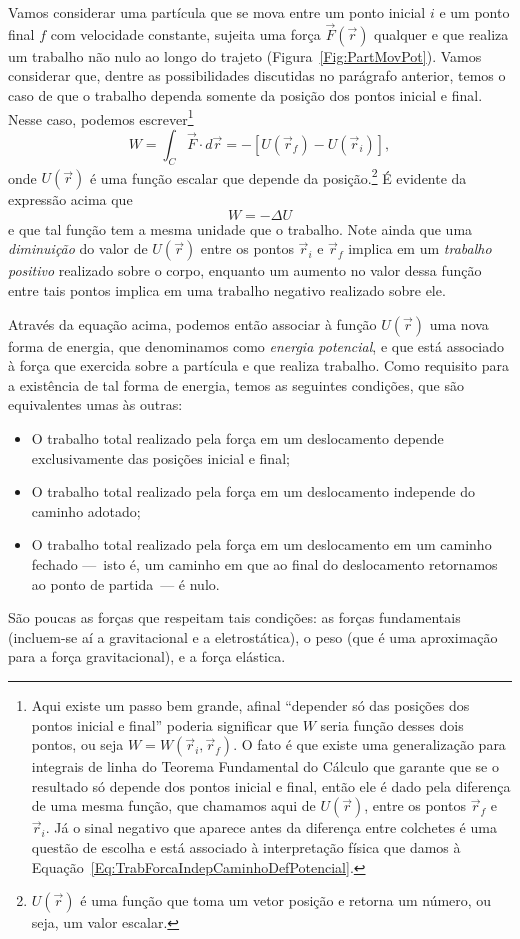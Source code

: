 Vamos considerar uma partícula que se mova entre um ponto inicial $i$ e um ponto final $f$ com velocidade constante, sujeita uma força $\vec{F}(\vec{r})$ qualquer e que realiza um trabalho não nulo ao longo do trajeto (Figura~\ref{Fig:PartMovPot}). Vamos considerar que, dentre as possibilidades discutidas no parágrafo anterior, temos o caso de que o trabalho dependa somente da posição dos pontos inicial e final. Nesse caso, podemos escrever\footnote{Aqui existe um passo bem grande, afinal ``depender só das posições dos pontos inicial e final'' poderia significar que $W$ seria função desses dois pontos, ou seja $W = W(\vec{r}_i, \vec{r}_f)$. O fato é que existe uma generalização para integrais de linha do Teorema Fundamental do Cálculo que garante que se o resultado só depende dos pontos inicial e final, então ele é dado pela diferença de uma mesma função, que chamamos aqui de $U(\vec{r})$, entre os pontos $\vec{r}_f$ e $\vec{r}_i$. Já o sinal negativo que aparece antes da diferença entre colchetes é uma questão de escolha e está associado à interpretação física que damos à Equação~\eqref{Eq:TrabForcaIndepCaminhoDefPotencial}.}
\begin{equation}\label{Eq:TrabForcaIndepCaminhoDefPotencial}
    W = \int_C \vec{F}\cdot d\vec{r} = -[U(\vec{r}_f) - U(\vec{r}_i)],
\end{equation}
%
onde $U(\vec{r})$ é uma função escalar que depende da posição.\footnote[][2cm]{$U(\vec{r})$ é uma função que toma um vetor posição e retorna um número, ou seja, um valor escalar.} É evidente da expressão acima que
\begin{equation}
    W = - \Delta U
\end{equation}
%
e que tal função tem a mesma unidade que o trabalho. Note ainda que uma \emph{diminuição} do valor de $U(\vec{r})$ entre os pontos $\vec{r}_i$ e $\vec{r}_f$ implica em um \emph{trabalho positivo} realizado sobre o corpo, enquanto um aumento no valor dessa função entre tais pontos implica em uma trabalho negativo realizado sobre ele.

Através da equação acima, podemos então associar à função $U(\vec{r})$ uma nova forma de energia, que denominamos como \emph{energia potencial}, e que está associado à força que exercida sobre a partícula e que realiza trabalho. Como requisito para a existência de tal forma de energia, temos as seguintes condições, que são equivalentes umas às outras:
\begin{itemize}
    \item O trabalho total realizado pela força em um deslocamento depende exclusivamente das posições inicial e final;
    \item O trabalho total realizado pela força em um deslocamento independe do caminho adotado;
    \item O trabalho total realizado pela força em um deslocamento em um caminho fechado ---~isto é, um caminho em que ao final do deslocamento retornamos ao ponto de partida~--- é nulo.
\end{itemize}
%
São poucas as forças que respeitam tais condições: as forças fundamentais (incluem-se aí a gravitacional e a eletrostática), o peso (que é uma aproximação para a força gravitacional), e a força elástica. 

